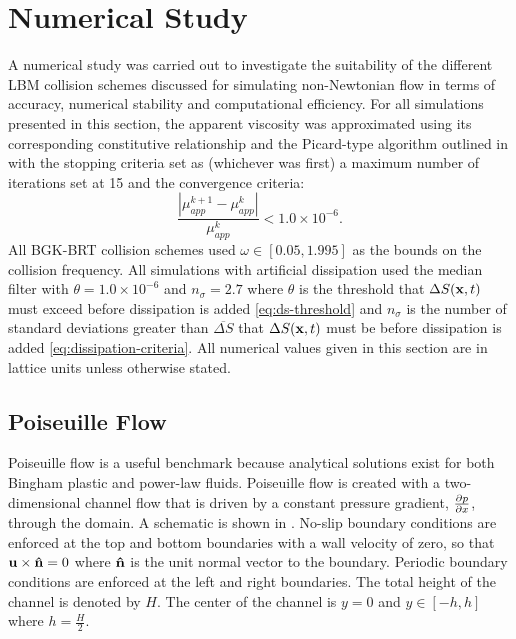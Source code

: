 \section{Numerical Study} \label{sec:numerical-study}

A numerical study was carried out to investigate the suitability of the different LBM collision schemes discussed for simulating non-Newtonian flow in terms of accuracy, numerical stability and computational efficiency.
For all simulations presented in this section, the apparent viscosity was approximated using its corresponding constitutive relationship and the Picard-type algorithm outlined in  with the stopping criteria set as (whichever was first) a maximum number of iterations set at 15 and the convergence criteria:
\begin{equation} \label{eq:mu-app-conv}
\frac{\left|\mu_{app}^{k+1} - \mu_{app}^{k}\right|}{\mu_{app}^{k}} < 1.0 \times 10^{-6}.
\end{equation}
All BGK-BRT collision schemes used $\omega \in [0.05, 1.995]$ as the bounds on the collision frequency.
All simulations with artificial dissipation used the median filter with $\theta = 1.0 \times 10^{-6}$ and $n_{\sigma} = 2.7$ where $\theta$ is the threshold that $\Delta S(\mathbf{x}, t)$ must exceed before dissipation is added \eqref{eq:ds-threshold} and $n_{\sigma}$ is the number of standard deviations greater than $\overline{\Delta S}$ that $\Delta S(\mathbf{x}, t)$ must be before dissipation is added \eqref{eq:dissipation-criteria}.
All numerical values given in this section are in lattice units unless otherwise stated.

\subsection{Poiseuille Flow}

Poiseuille flow is a useful benchmark because analytical solutions exist for both Bingham plastic and power-law fluids.
Poiseuille flow is created with a two-dimensional channel flow that is driven by a constant pressure gradient, $\frac{\partial p}{\partial x}$, through the domain.
A schematic is shown in .
No-slip boundary conditions are enforced at the top and bottom boundaries with a wall velocity of zero, so that $\mathbf{u} \times \mathbf{\hat{n}} = 0$ where $\mathbf{\hat{n}}$ is the unit normal vector to the boundary. 
Periodic boundary conditions are enforced at the left and right boundaries.
The total height of the channel is denoted by $H$.
The center of the channel is $y = 0$ and $y \in [-h, h]$ where $h = \frac{H}{2}$.

